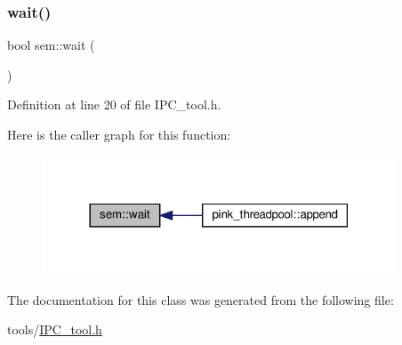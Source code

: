 \subsubsection{\texorpdfstring{wait()}{wait()}}
{\footnotesize\ttfamily bool sem\+::wait (\begin{DoxyParamCaption}{ }\end{DoxyParamCaption})\hspace{0.3cm}{\ttfamily [inline]}}



Definition at line 20 of file I\+P\+C\+\_\+tool.\+h.

Here is the caller graph for this function\+:
\nopagebreak
\begin{figure}[H]
\begin{center}
\leavevmode
\includegraphics[width=297pt]{classsem_a0195e3b2273cb8d2c814778b0521e847_icgraph}
\end{center}
\end{figure}


The documentation for this class was generated from the following file\+:\begin{DoxyCompactItemize}
\item 
tools/\hyperlink{_i_p_c__tool_8h}{I\+P\+C\+\_\+tool.\+h}\end{DoxyCompactItemize}
